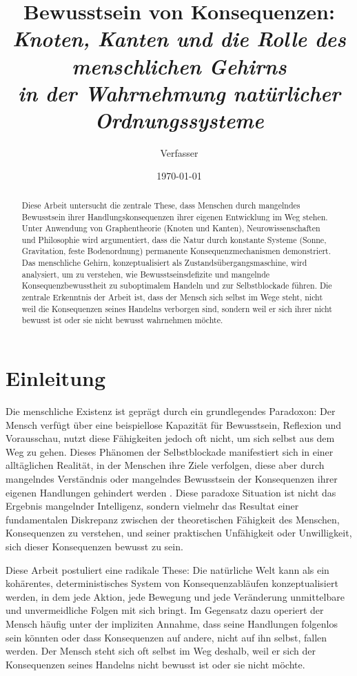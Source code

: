 \documentclass[12pt,a4paper]{article}
\title{\Large Bewusstsein von Konsequenzen:\\
\textit{Knoten, Kanten und die Rolle des menschlichen Gehirns\\
in der Wahrnehmung natürlicher Ordnungssysteme}}
\author{Verfasser}
\date{\today}
\begin{document}
\maketitle

\begin{abstract}
Diese Arbeit untersucht die zentrale These, dass Menschen durch mangelndes Bewusstsein ihrer Handlungskonsequenzen ihrer eigenen Entwicklung im Weg stehen. Unter Anwendung von Graphentheorie (Knoten und Kanten), Neurowissenschaften und Philosophie wird argumentiert, dass die Natur durch konstante Systeme (Sonne, Gravitation, feste Bodenordnung) permanente Konsequenzmechanismen demonstriert. Das menschliche Gehirn, konzeptualisiert als Zustandsübergangsmaschine, wird analysiert, um zu verstehen, wie Bewusstseinsdefizite und mangelnde Konsequenzbewusstheit zu suboptimalem Handeln und zur Selbstblockade führen. Die zentrale Erkenntnis der Arbeit ist, dass der Mensch sich selbst im Wege steht, nicht weil die Konsequenzen seines Handelns verborgen sind, sondern weil er sich ihrer nicht bewusst ist oder sie nicht bewusst wahrnehmen möchte.
\end{abstract}

\section{Einleitung}

Die menschliche Existenz ist geprägt durch ein grundlegendes Paradoxon: Der Mensch verfügt über eine beispiellose Kapazität für Bewusstsein, Reflexion und Vorausschau, nutzt diese Fähigkeiten jedoch oft nicht, um sich selbst aus dem Weg zu gehen. Dieses Phänomen der Selbstblockade manifestiert sich in einer alltäglichen Realität, in der Menschen ihre Ziele verfolgen, diese aber durch mangelndes Verständnis oder mangelndes Bewusstsein der Konsequenzen ihrer eigenen Handlungen gehindert werden \cite{jonas2003prinzip}. Diese paradoxe Situation ist nicht das Ergebnis mangelnder Intelligenz, sondern vielmehr das Resultat einer fundamentalen Diskrepanz zwischen der theoretischen Fähigkeit des Menschen, Konsequenzen zu verstehen, und seiner praktischen Unfähigkeit oder Unwilligkeit, sich dieser Konsequenzen bewusst zu sein.

Diese Arbeit postuliert eine radikale These: Die natürliche Welt kann als ein kohärentes, deterministisches System von Konsequenzabläufen konzeptualisiert werden, in dem jede Aktion, jede Bewegung und jede Veränderung unmittelbare und unvermeidliche Folgen mit sich bringt. Im Gegensatz dazu operiert der Mensch häufig unter der impliziten Annahme, dass seine Handlungen folgenlos sein könnten oder dass Konsequenzen auf andere, nicht auf ihn selbst, fallen werden. Der Mensch steht sich oft selbst im Weg deshalb, weil er sich der Konsequenzen seines Handelns nicht bewusst ist oder sie nicht möchte. 
\end{document}
